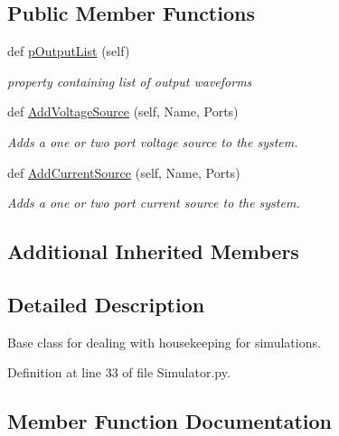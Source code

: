 \subsection*{Public Member Functions}
\begin{DoxyCompactItemize}
\item 
def \hyperlink{classSignalIntegrity_1_1SystemDescriptions_1_1Simulator_1_1Simulator_a4e93b3fc1994f14f72cdcebbf9b68127}{p\+Output\+List} (self)
\begin{DoxyCompactList}\small\item\em property containing list of output waveforms \end{DoxyCompactList}\item 
def \hyperlink{classSignalIntegrity_1_1SystemDescriptions_1_1Simulator_1_1Simulator_ade4e57186554be52881092b572eac2ba}{Add\+Voltage\+Source} (self, Name, Ports)
\begin{DoxyCompactList}\small\item\em Adds a one or two port voltage source to the system. \end{DoxyCompactList}\item 
def \hyperlink{classSignalIntegrity_1_1SystemDescriptions_1_1Simulator_1_1Simulator_a85b87f904dc4ef7e38c80612f8da486a}{Add\+Current\+Source} (self, Name, Ports)
\begin{DoxyCompactList}\small\item\em Adds a one or two port current source to the system. \end{DoxyCompactList}\end{DoxyCompactItemize}
\subsection*{Additional Inherited Members}


\subsection{Detailed Description}
Base class for dealing with housekeeping for simulations. 



Definition at line 33 of file Simulator.\+py.



\subsection{Member Function Documentation}
\mbox{\label{classSignalIntegrity_1_1SystemDescriptions_1_1Simulator_1_1Simulator_a85b87f904dc4ef7e38c80612f8da486a}} 
